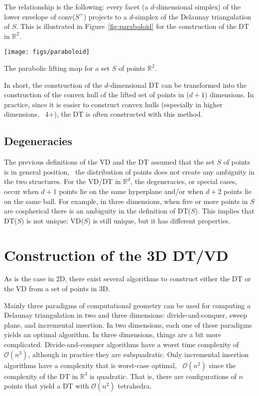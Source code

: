 %

The relationship is the following: every facet (a $d$-dimensional simplex) of the lower envelope of conv($S^{+}$) projects to a $d$-simplex of the Delaunay triangulation of $S$. 
This is illustrated in Figure~\ref{fig:paraboloid} for the construction of the DT in $\mathbb{R}^{2}$. 
\begin{marginfigure}
  \centering
  \texttt{[image: figs/paraboloid]}
  \caption{The parabolic lifting map for a set $S$ of points $\mathbb{R}^2$.}%
\label{fig:paraboloid}
\end{marginfigure}

%

In short, the construction of the $d$-dimensional DT can be transformed into the construction of the convex hull of the lifted set of points in ($d+1$) dimensions.
In practice, since it is easier to construct convex hulls (especially in higher dimensions, \ie\ 4+), the DT is often constructed with this method.


\subsection{Degeneracies}%
\label{sec:degeneracies}

The previous definitions of the VD and the DT assumed that the set $S$ of points is in general position, \ie\ the distribution of points does not create any ambiguity in the two structures. 
For the VD/DT in $\mathbb{R}^{d}$, the degeneracies, or special cases, occur when $d+1$ points lie on the same hyperplane and/or when $d+2$ points lie on the same ball. 
For example, in three dimensions, when five or more points in $S$ are cospherical there is an ambiguity in the definition of DT($S$). 
This implies that DT($S$) is not unique; VD($S$) is still unique, but it has different properties.


%
\section[Construction of 3D DT/VD]{Construction of the 3D DT/VD}

As is the case in 2D, there exist several algorithms to construct either the DT or the VD from a set of points in 3D.

%

Mainly three paradigms of computational geometry can be used for computing a Delaunay triangulation in two and three dimensions:  divide-and-conquer, sweep plane, and incremental insertion.
In two dimensions, each one of these paradigms yields an optimal algorithm.
In three dimensions, things are a bit more complicated.
Divide-and-conquer algorithms have a worst time complexity of $\mathcal{O}(n^3)$, although in practice they are subquadratic.
Only incremental insertion algorithms have a complexity that is worst-case optimal, \ie\ $\mathcal{O}(n^2)$ since the complexity of the DT in $\mathbb{R}^3$ is quadratic.
That is, there are configurations of $n$ points that yield a DT with $\mathcal{O}(n^2)$ tetrahedra.

